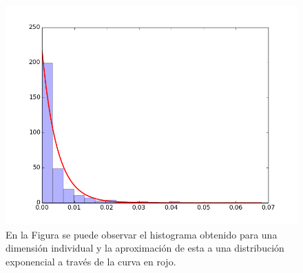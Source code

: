 \begin{itemize}
		\begin{figure}[htbp]
			\centering
			\centerline{ \includegraphics[scale=0.50]{img/histograma-curva.png} }
			\caption[Histograma con curva exponencial]{En la Figura se puede observar el histograma obtenido para una dimensión individual y la aproximación de esta a una distribución exponencial a través de la curva en rojo.}
			\label{fig: exponential-fit}
		\end{figure}
		
	
	\end{itemize}